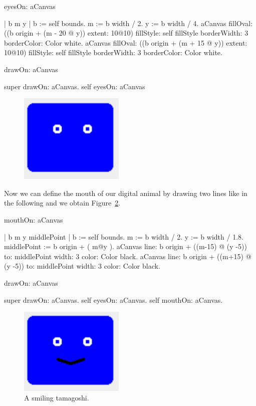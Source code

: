 \documentclass[a4paper,10pt,twoside]{book}
\begin{document}
\begin{code}{}
eyesOn: aCanvas

	| b m y |
	b := self bounds.
	m := b width / 2.
	y := b width / 4.
	aCanvas 
			fillOval: ((b origin   + (m - 20 @ y)) extent: 10@10)
			fillStyle: self fillStyle 
			borderWidth: 3
			borderColor: Color white.
	aCanvas 
			fillOval: ((b origin   + (m + 15 @ y)) extent: 10@10)
			fillStyle: self fillStyle 
			borderWidth: 3
			borderColor: Color white.
\end{code}

\begin{code}{}
drawOn: aCanvas

	super drawOn: aCanvas.
	self eyesOn: aCanvas
	
\end{code}

\begin{figure}
\begin{center}
\includegraphics[width=5cm]{figures/justEyes}
\caption{\label{fig:tomastate}}
\end{center}
\end{figure}



Now we can define the mouth of our digital animal by drawing two lines like in the following and we obtain Figure~\ref{fig:Smiling}.
\begin{code}{}
mouthOn: aCanvas

	| b m y middlePoint |
	b := self bounds.
	m := b width / 2.
	y := b width / 1.8.
	middlePoint := b origin +  ( m@y ).
	aCanvas 
		line: b origin + ((m-15) @ (y -5)) to:  middlePoint width: 3 color: Color black.
	aCanvas 
		line: b origin + ((m+15) @ (y -5)) to: middlePoint width: 3 color: Color black.
\end{code}

\begin{code}{}
drawOn: aCanvas

	super drawOn: aCanvas.
	self eyesOn: aCanvas.
	self mouthOn: aCanvas.
\end{code}

\begin{figure}
\begin{center}
\includegraphics[width=5cm]{figures/Smiling}
\caption{A smiling tamagoshi.\label{fig:Smiling}}
\end{center}
\end{figure}
\end{document}
